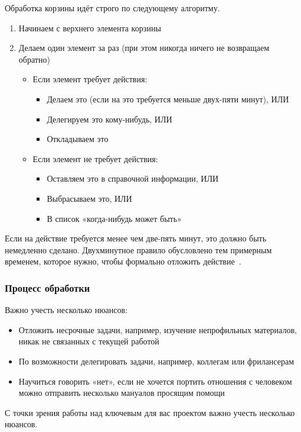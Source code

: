 \documentclass{../industrial-development}
\begin{document}
\lecturenotes

Обработка корзины идёт строго по следующему алгоритму.
\begin{enumerate}
\item Начинаем с верхнего элемента корзины
\item Делаем один элемент за раз (при этом никогда ничего не возвращаем обратно)
  \begin{itemize}
  \item Если элемент требует действия:
    \begin{itemize}
    \item Делаем это (если на это требуется меньше двух-пяти минут), ИЛИ
    \item Делегируем это кому-нибудь, ИЛИ
    \item Откладываем это
    \end{itemize}
  \item Если элемент не требует действия:
    \begin{itemize}
    \item Оставляем это в справочной информации, ИЛИ
    \item Выбрасываем это, ИЛИ
    \item В список «когда-нибудь может быть»
    \end{itemize}
  \end{itemize}
\end{enumerate}
Если на действие требуется менее чем две-пять минут, это должно быть немедленно сделано. Двухминутное правило обусловлено тем примерным временем, которое нужно, чтобы формально отложить действие~\cite{GTDWikipedia}.

\begin{frame} \frametitle{Процесс обработки}
Важно учесть несколько нюансов:
  \begin{itemize}
  \item Отложить несрочные задачи, например, изучение непрофильных материалов, никак не связанных с текущей работой
  \item По возможности делегировать задачи, например, коллегам или фрилансерам
  \item Научиться говорить «нет», если не хочется портить отношения с человеком можно отправить несколько мануалов просящим помощи
  \end{itemize}
\end{frame}

\lecturenotes

С точки зрения работы над ключевым для вас проектом важно учесть несколько нюансов.
\end{document}
